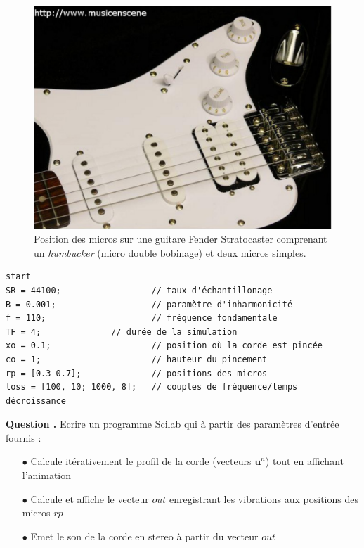 \documentclass[a4,12pt]{article}
\newcommand{\ub}{\mathbf{u}}
\newcounter{Nbquestion}
\newcommand*\question{%
\stepcounter{Nbquestion}%
\textbf{Question \theNbquestion. }}
\begin{document}
\begin{figure}
	\begin{center}
		\includegraphics[scale=0.4,trim = 0mm 0mm 0mm 15mm,clip]{images/micros.pdf}
		\caption{Position des micros sur une guitare Fender Stratocaster comprenant un \textit{humbucker} 			(micro double bobinage) et deux micros simples.}
		\label{fig:micros}
	\end{center}
\end{figure}

\begin{lstlisting}[frame=single,caption=Paramètres d'entrée]  
start
SR = 44100;                  // taux d'échantillonage 
B = 0.001;                   // paramètre d'inharmonicité
f = 110;                     // fréquence fondamentale
TF = 4;			     // durée de la simulation
xo = 0.1;                    // position où la corde est pincée
co = 1;                      // hauteur du pincement
rp = [0.3 0.7];              // positions des micros
loss = [100, 10; 1000, 8];   // couples de fréquence/temps décroissance
\end{lstlisting}


\begin{mdframed}[style=exampledefault]
\question Ecrire un programme Scilab qui à partir des paramètres d'entrée fournis : \\

\begin{itemize}
	\item[$\bullet$] Calcule itérativement le profil de la corde (vecteurs $\ub^n$) tout en affichant l'animation\\
	\item[$\bullet$] Calcule et affiche le vecteur $out$ enregistrant les vibrations aux positions des micros $rp$\\ 	\item[$\bullet$] Emet le son de la corde en stereo à partir du vecteur $out$
\end{itemize}
\end{mdframed}
\end{document}
